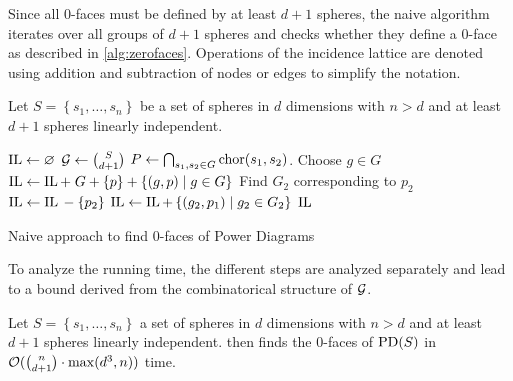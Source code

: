 Since all $0$-faces must be defined by at least $d+1$ spheres, the naive algorithm iterates over all groups of $d+1$ spheres and checks whether they define a $0$-face as described in \cref{alg:zerofaces}.
Operations of the incidence lattice are denoted using addition and subtraction of nodes or edges to simplify the notation.
\begin{algorithm}[tb]
    Let $S = \left\{ s_1, \dots, s_n \right\}$ be a set of spheres in $d$ dimensions with $n > d$ and at least $d+1$ spheres linearly independent.

    \begin{algorithmic}[1]
            \State $\operatorname{IL} \gets \varnothing$
            \State $\mathcal{G} \gets \binom{S}{d + 1}$
            \Statex
                \State $P \gets \bigcap_{s_1, s_2 \in G} \operatorname{chor}(s_1, s_2)$.
                    \State Choose $g \in G$
                        \State $\operatorname{IL} \gets \operatorname{IL} +\; G + \left\{ p \right\} + \left\{ (g, p) \mid g \in G \right\}$
                    \EndIf
                \EndIf
            \EndFor
            \Statex
                    \State Find $G_2$ corresponding to $p_2$
                    \State $\operatorname{IL} \gets \operatorname{IL}{} - \left\{ p_2 \right\}$
                    \State $\operatorname{IL} \gets \operatorname{IL} + \left\{ (g_2, p_1) \mid g_2 \in G_2 \right\}$
                \EndIf
            \EndFor
            \State \Return $\operatorname{IL}$
        \EndFunction
    \end{algorithmic}
    \caption{Naive approach to find $0$-faces of Power Diagrams}
    \label{alg:zerofaces}
\end{algorithm}
To analyze the running time, the different steps are analyzed separately and lead to a bound derived from the combinatorical structure of $\mathcal{G}$.
\begin{theorem}
    Let $S = \left\{ s_1, \dots, s_n \right\}$ a set of spheres in $d$ dimensions with $n > d$ and at least $d + 1$ spheres linearly independent.
     then finds the $0$-faces of $\operatorname{PD}(S)$ in $\mathcal{O}(\binom{n}{d + 1} \cdot \max(d^3, n))$ time.
\end{theorem}
